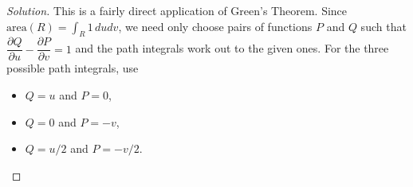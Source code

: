 \documentclass[Shifrin_Solutions_Spring_2018]{subfiles}
\begin{document}
\begin{proof}[Solution]
This is a fairly direct application of Green's Theorem. Since $\text{area}(R) = \int_R 1\, dudv$, we need only choose pairs of functions $P$ and $Q$ such that
$\dfrac{\partial Q}{\partial u} - \dfrac{\partial P}{\partial v} = 1$ and the path integrals work out to the given ones.
For the three possible path integrals, use
\begin{itemize}

\item $Q = u$ and $P = 0$,

\item $Q=0$ and $P = -v$,

\item $Q = u/2$ and $P = -v/2$.
\end{itemize}


\end{proof}
\end{document}
